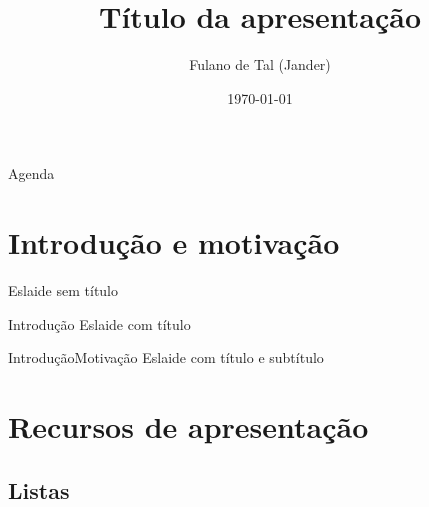 \documentclass[
    brazilian, %
    12pt, %
    aspectratio = 169, %
]{beamer}
\title{Título da apresentação}
\author{Fulano de Tal ({\rmfamily Jander})}
\date{\today}
\begin{document}
\begin{frame}
    \titlepage

\end{frame}

\begin{frame}{Agenda}
    \tableofcontents
    \note{\tableofcontents}
\end{frame}


%


\section{Introdução e motivação}

\begin{frame}
    Eslaide sem título
\end{frame}

\begin{frame}{Introdução}
    Eslaide com título
\end{frame}

\begin{frame}{Introdução}{Motivação}
    Eslaide com título e subtítulo
\end{frame}


\section[Recursos]{Recursos de apresentação}

\subsection{Listas}

\end{document}
